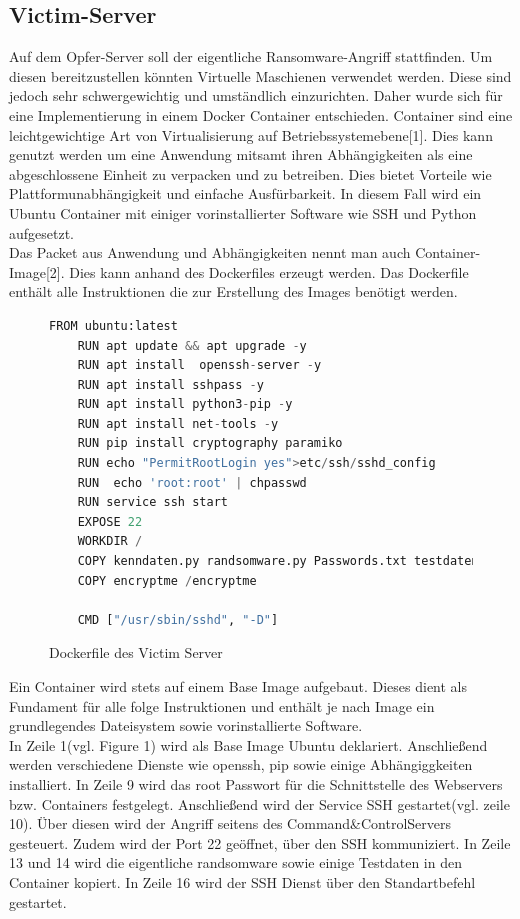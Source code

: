 \documentclass[12pt]{article}
\begin{document}
\subsection{Victim-Server}
	Auf dem Opfer-Server soll der eigentliche Ransomware-Angriff stattfinden. Um diesen bereitzustellen könnten Virtuelle Maschienen verwendet werden. Diese sind jedoch sehr schwergewichtig und umständlich einzurichten.
	Daher wurde sich für eine Implementierung in einem Docker Container entschieden.
	Container sind eine leichtgewichtige Art von Virtualisierung auf Betriebssystemebene[1]. Dies kann genutzt werden um eine Anwendung mitsamt ihren Abhängigkeiten als eine abgeschlossene Einheit zu verpacken und zu betreiben. Dies bietet Vorteile wie Plattformunabhängigkeit und einfache Ausfürbarkeit. In diesem Fall wird ein Ubuntu Container mit einiger vorinstallierter Software wie SSH und Python aufgesetzt.\\
	Das Packet aus Anwendung und Abhängigkeiten
	nennt man auch Container-Image[2]. Dies kann anhand des Dockerfiles erzeugt werden. Das Dockerfile enthält alle Instruktionen die zur Erstellung des Images benötigt werden.  
	\begin{figure}[h]
	\caption{Dockerfile des Victim Server}
	\begin{lstlisting}[language=python, style=code]
	FROM ubuntu:latest
	RUN apt update && apt upgrade -y 
	RUN apt install  openssh-server -y
	RUN apt install sshpass -y
	RUN apt install python3-pip -y 
	RUN apt install net-tools -y 
	RUN pip install cryptography paramiko
	RUN echo "PermitRootLogin yes">etc/ssh/sshd_config
	RUN  echo 'root:root' | chpasswd
	RUN service ssh start
	EXPOSE 22
	WORKDIR /
	COPY kenndaten.py randsomware.py Passwords.txt testdaten.txt /
	COPY encryptme /encryptme
	
	CMD ["/usr/sbin/sshd", "-D"]
		\end{lstlisting}
		
		\end{figure}
\newpage
Ein Container wird stets auf einem Base Image aufgebaut. Dieses dient als Fundament für alle folge Instruktionen und enthält je nach Image ein grundlegendes Dateisystem sowie vorinstallierte Software.\\
In Zeile 1(vgl. Figure 1) wird als Base Image Ubuntu deklariert. 
Anschließend werden verschiedene Dienste wie openssh, pip sowie einige Abhängiggkeiten installiert.
In Zeile 9 wird das root Passwort für die Schnittstelle des Webservers bzw. Containers festgelegt. Anschließend wird der Service SSH gestartet(vgl. zeile 10). Über diesen wird der Angriff seitens des Command\&Control\-Servers gesteuert. Zudem wird der Port 22 geöffnet, über den SSH kommuniziert. In Zeile 13 und 14 wird die eigentliche randsomware sowie einige Testdaten in den Container kopiert. In Zeile 16 wird der SSH Dienst über den Standartbefehl gestartet. \\
\end{document}
